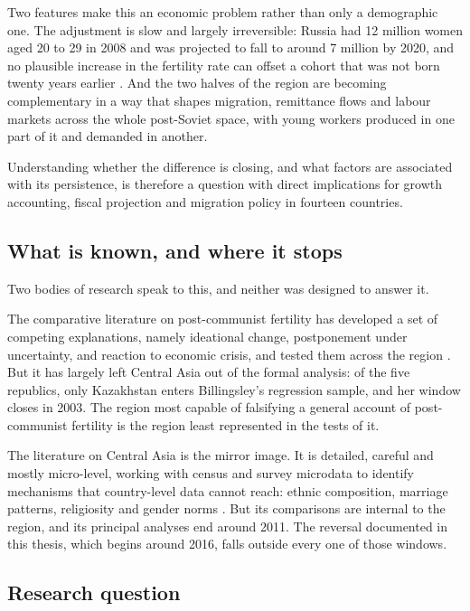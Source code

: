 Two features make this an economic problem rather than only a demographic one. The adjustment is slow and largely irreversible: Russia had 12 million women aged 20 to 29 in 2008 and was projected to fall to around 7 million by 2020, and no plausible increase in the fertility rate can offset a cohort that was not born twenty years earlier \parencite{brainerd2010}. And the two halves of the region are becoming complementary in a way that shapes migration, remittance flows and labour markets across the whole post-Soviet space, with young workers produced in one part of it and demanded in another.

Understanding whether the difference is closing, and what factors are associated with its persistence, is therefore a question with direct implications for growth accounting, fiscal projection and migration policy in fourteen countries.

\subsection{What is known, and where it stops}
\label{sec:what-is-known}

Two bodies of research speak to this, and neither was designed to answer it.

The comparative literature on post-communist fertility has developed a set of competing explanations, namely ideational change, postponement under uncertainty, and reaction to economic crisis, and tested them across the region \parencite{billingsley2010}. But it has largely left Central Asia out of the formal analysis: of the five republics, only Kazakhstan enters Billingsley's regression sample, and her window closes in 2003. The region most capable of falsifying a general account of post-communist fertility is the region least represented in the tests of it.

The literature on Central Asia is the mirror image. It is detailed, careful and mostly micro-level, working with census and survey microdata to identify mechanisms that country-level data cannot reach: ethnic composition, marriage patterns, religiosity and gender norms \parencite{spoorenberg2013,spoorenberg2015,dommaraju2008,kumo2024}. But its comparisons are internal to the region, and its principal analyses end around 2011. The reversal documented in this thesis, which begins around 2016, falls outside every one of those windows.

\subsection{Research question}
\label{sec:research-question}

